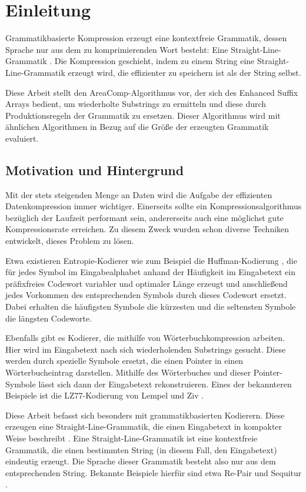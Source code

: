 \chapter{Einleitung}

Grammatikbasierte Kompression erzeugt eine kontextfreie Grammatik, dessen Sprache nur aus dem zu komprimierenden Wort besteht: Eine Straight-Line-Grammatik \cite{benz_effective_2013}. Die Kompression geschieht, indem zu einem String eine Straight-Line-Grammatik erzeugt wird, die effizienter zu speichern ist als der String selbst.

Diese Arbeit stellt den AreaComp-Algorithmus vor, der sich des Enhanced Suffix Arrays bedient, um wiederholte Substrings zu ermitteln und diese durch Produktionsregeln der Grammatik zu ersetzen.
Dieser Algorithmus wird mit ähnlichen Algorithmen in Bezug auf die Größe der erzeugten Grammatik evaluiert.

\section{Motivation und Hintergrund}

Mit der stets steigenden Menge an Daten wird die Aufgabe der effizienten Datenkompression immer wichtiger. Einerseits sollte ein Kompressionsalgorithmus bezüglich der Laufzeit performant sein, andererseits auch eine möglichst gute Kompressionsrate erreichen. 
Zu diesem Zweck wurden schon diverse Techniken entwickelt, dieses Problem zu lösen. 

Etwa existieren Entropie-Kodierer wie zum Beispiel die Huffman-Kodierung \cite{huffman_method_1952}, die für jedes Symbol im Eingabealphabet anhand der Häufigkeit im Eingabetext ein präfixfreies Codewort variabler und optimaler Länge erzeugt und anschließend jedes Vorkommen des entsprechenden Symbols durch dieses Codewort ersetzt. 
Dabei erhalten die häufigsten Symbole die kürzesten und die seltensten Symbole die längsten Codeworte.

Ebenfalls gibt es Kodierer, die mithilfe von Wörterbuchkompression arbeiten. Hier wird im Eingabetext nach sich wiederholenden Substrings gesucht. Diese werden durch spezielle Symbole ersetzt, die einen Pointer in einen Wörterbucheintrag darstellen. 
Mithilfe des Wörterbuches und dieser Pointer-Symbole lässt sich dann der Eingabetext rekonstruieren.
Eines der bekannteren Beispiele ist die LZ77-Kodierung von Lempel und Ziv \cite{ziv_universal_1977}.

Diese Arbeit befasst sich besonders mit grammatikbasierten Kodierern. Diese erzeugen eine Straight-Line-Grammatik, die einen Eingabetext in kompakter Weise beschreibt \cite{kieffer_grammar-based_2000}. 
Eine Straight-Line-Grammatik ist eine kontextfreie Grammatik, die einen bestimmten String (in diesem Fall, den Eingabetext) eindeutig erzeugt. Die Sprache dieser Grammatik besteht also nur aus dem entsprechenden String. Bekannte Beispiele hierfür sind etwa Re-Pair \cite{larsson_offline_1999} und Sequitur \cite{nevill-manning_identifying_1997}.

